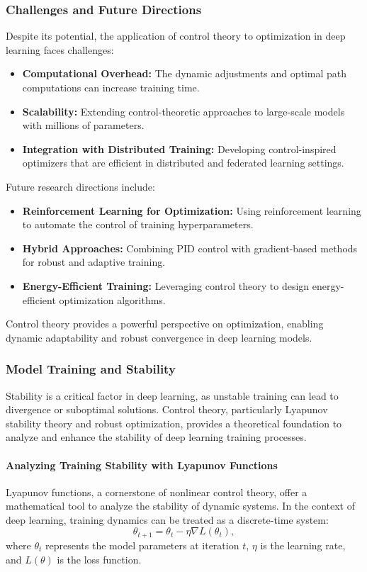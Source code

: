 \documentclass{IEEEojcsys}
\begin{document}
\subsubsection{Challenges and Future Directions}
Despite its potential, the application of control theory to optimization in deep learning faces challenges:
\begin{itemize}
    \item \textbf{Computational Overhead:} The dynamic adjustments and optimal path computations can increase training time.
    \item \textbf{Scalability:} Extending control-theoretic approaches to large-scale models with millions of parameters.
    \item \textbf{Integration with Distributed Training:} Developing control-inspired optimizers that are efficient in distributed and federated learning settings.
\end{itemize}

Future research directions include:
\begin{itemize}
    \item \textbf{Reinforcement Learning for Optimization:} Using reinforcement learning to automate the control of training hyperparameters.
    \item \textbf{Hybrid Approaches:} Combining PID control with gradient-based methods for robust and adaptive training.
    \item \textbf{Energy-Efficient Training:} Leveraging control theory to design energy-efficient optimization algorithms.
\end{itemize}

Control theory provides a powerful perspective on optimization, enabling dynamic adaptability and robust convergence in deep learning models.

\subsubsection{Model Training and Stability}
Stability is a critical factor in deep learning, as unstable training can lead to divergence or suboptimal solutions. Control theory, particularly Lyapunov stability theory and robust optimization, provides a theoretical foundation to analyze and enhance the stability of deep learning training processes.

\paragraph{Analyzing Training Stability with Lyapunov Functions}
Lyapunov functions, a cornerstone of nonlinear control theory, offer a mathematical tool to analyze the stability of dynamic systems. In the context of deep learning, training dynamics can be treated as a discrete-time system:
\[
\theta_{t+1} = \theta_t - \eta \nabla L(\theta_t),
\]
where $\theta_t$ represents the model parameters at iteration $t$, $\eta$ is the learning rate, and $L(\theta)$ is the loss function.
\end{document}
